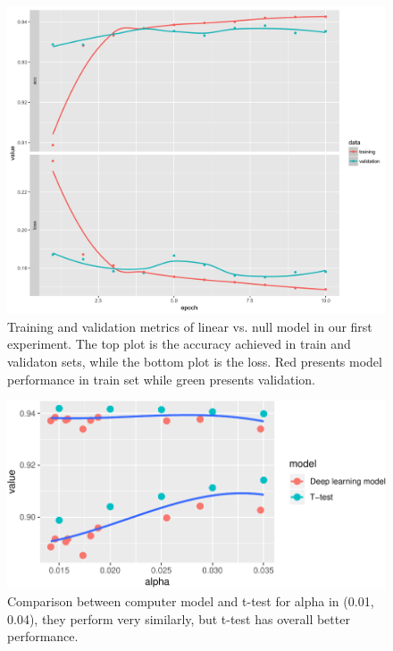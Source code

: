 \documentclass[12pt]{article}
\begin{document}
\begin{figure}[h]
\centerline{\includegraphics[width=15cm]{figures/linear_history_plot.png}}
\caption{Training and validation metrics of linear vs. null model in our first experiment. The top plot is the accuracy achieved in train and validaton sets, while the bottom plot is the loss. Red presents model performance in train set while green presents validation.}
\label{histlinear}
\end{figure}

\begin{figure}

{\centering \includegraphics{pc_plots_files/figure-latex/ttdl-1} 

}

\caption{Comparison between computer model and t-test for alpha in (0.01, 0.04), they perform very similarly, but t-test has overall better performance.}\label{fig:ttdl}
\end{figure}



\end{document}
